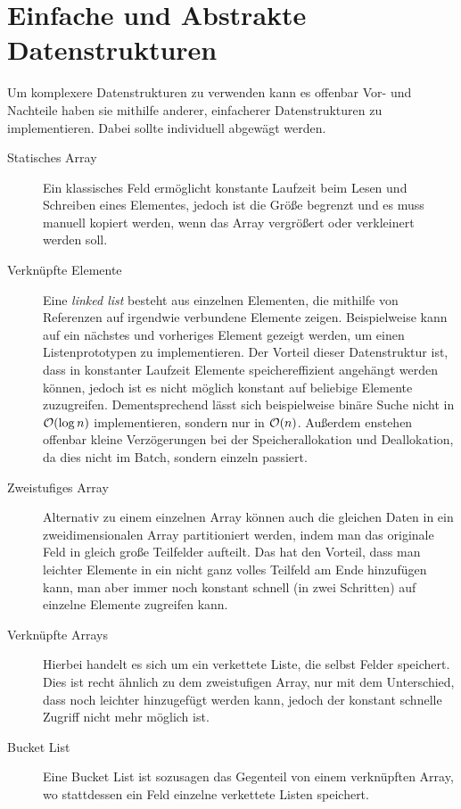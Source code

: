 \section{Einfache und Abstrakte Datenstrukturen}
Um komplexere Datenstrukturen zu verwenden kann es offenbar Vor- und Nachteile haben sie mithilfe anderer, einfacherer Datenstrukturen zu implementieren.
Dabei sollte individuell abgewägt werden.
\begin{description}
    \item[Statisches Array] Ein klassisches Feld ermöglicht konstante Laufzeit beim Lesen und Schreiben eines Elementes, jedoch ist die Größe begrenzt und es muss manuell kopiert werden, wenn das Array vergrößert oder verkleinert werden soll.

    \item[Verknüpfte Elemente] Eine \emph{linked list} besteht aus einzelnen Elementen, die mithilfe von Referenzen auf irgendwie verbundene Elemente zeigen.
        Beispielweise kann auf ein nächstes und vorheriges Element gezeigt werden, um einen Listenprototypen zu implementieren.
        Der Vorteil dieser Datenstruktur ist, dass in konstanter Laufzeit Elemente speichereffizient angehängt werden können, jedoch ist es nicht möglich konstant auf beliebige Elemente zuzugreifen.
        Dementsprechend lässt sich beispielweise binäre Suche nicht in \(\mathcal O(\log n)\) implementieren, sondern nur in \(\mathcal O(n)\).
        Außerdem enstehen offenbar kleine Verzögerungen bei der Speicherallokation und Deallokation, da dies nicht im Batch, sondern einzeln passiert.

    \item[Zweistufiges Array] Alternativ zu einem einzelnen Array können auch die gleichen Daten in ein zweidimensionalen Array partitioniert werden, indem man das originale Feld in gleich große Teilfelder aufteilt.
        Das hat den Vorteil, dass man leichter Elemente in ein nicht ganz volles Teilfeld am Ende hinzufügen kann, man aber immer noch konstant schnell (in zwei Schritten) auf einzelne Elemente zugreifen kann.

    \item[Verknüpfte Arrays] Hierbei handelt es sich um ein verkettete Liste, die selbst Felder speichert.
        Dies ist recht ähnlich zu dem zweistufigen Array, nur mit dem Unterschied, dass noch leichter hinzugefügt werden kann, jedoch der konstant schnelle Zugriff nicht mehr möglich ist.

    \item[Bucket List] Eine Bucket List ist sozusagen das Gegenteil von einem verknüpften Array, wo stattdessen ein Feld einzelne verkettete Listen speichert.
\end{description}


